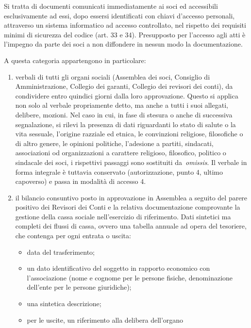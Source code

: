 Si tratta di documenti comunicati immediatamente ai soci ed accessibili
esclusivamente ad essi, dopo essersi identificati con chiavi d’accesso
personali, attraverso un sistema informatico ad accesso controllato, nel
rispetto dei requisiti minimi di sicurezza del codice (art. 33 e 34).
Presupposto per l’accesso agli atti è l’impegno da parte dei soci a non
diffondere in nessun modo la documentazione.  

A questa categoria appartengono in particolare:

\begin{enumerate}
    \item verbali di tutti gli organi sociali (Assemblea dei soci, Consiglio
        di Amministrazione, Collegio dei garanti, Collegio dei revisori dei
        conti), da condividere entro quindici giorni dalla loro
        approvazione. Questo si applica non solo al verbale propriamente
        detto, ma anche a tutti i suoi allegati, delibere, mozioni.
        Nel caso in cui, in fase di stesura o anche di successiva segnalazione, si
        rilevi la presenza di dati riguardanti lo stato di salute o la vita
        sessuale, l’origine razziale ed etnica, le convinzioni religiose,
        filosofiche o di altro genere, le opinioni politiche, l’adesione a partiti,
        sindacati, associazioni od organizzazioni a carattere religioso, filosofico,
        politico o sindacale dei soci, i rispettivi passaggi sono sostituiti
        da \emph{omissis}. Il verbale in forma integrale è tuttavia conservato
        (autorizzazione, punto 4, ultimo capoverso) e passa in modalità di accesso
        4.
    \item il bilancio consuntivo posto in approvazione in Assemblea a seguito
        del parere positivo dei Revisori dei Conti e la relativa
        documentazione comprovante la gestione della cassa sociale
        nell’esercizio di riferimento. 
        Dati sintetici ma completi dei flussi di cassa, ovvero una tabella
        annuale ad opera del tesoriere, che contenga per ogni entrata o uscita:
        \begin{itemize}
            \item data del trasferimento;
            \item un dato identificativo del soggetto in rapporto economico
                con l'associazione (nome e cognome per le persone fisiche,
                denominazione dell'ente per le persone giuridiche);
            \item una sintetica descrizione;
            \item per le uscite, un riferimento alla delibera dell'organo

\end{itemize}
\end{enumerate}
